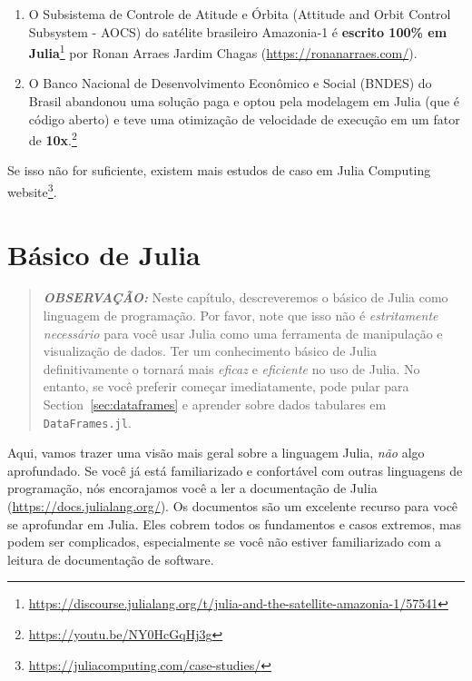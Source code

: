 \documentclass[
  notoc %
]{tufte-book}
\DeclareRobustCommand{\href}[2]{#2\footnote{\url{#1}}}
\newcommand{\passthrough}[1]{#1}
\begin{document}
\begin{enumerate}
{{  de 175x} para modelos de farmacologia da Pfizer usando GPUs em Julia}.
  Foi apresentado como um
  \href{https://chrisrackauckas.com/assets/Posters/ACoP11_Poster_Abstracts_2020.pdf}{poster}
  na 11ª American Conference of Pharmacometrics (ACoP11) e
  \href{https://web.archive.org/web/20210121164011/https://www.go-acop.org/abstract-awards}{ganhou
  um prêmio de qualidade}.
\item
  \href{https://discourse.julialang.org/t/julia-and-the-satellite-amazonia-1/57541}{O
  Subsistema de Controle de Atitude e Órbita (Attitude and Orbit Control
  Subsystem - AOCS) do satélite brasileiro Amazonia-1 é \textbf{escrito
  100\% em Julia}} por Ronan Arraes Jardim Chagas
  (\url{https://ronanarraes.com/}).
\item
  \href{https://youtu.be/NY0HcGqHj3g}{O Banco Nacional de
  Desenvolvimento Econômico e Social (BNDES) do Brasil abandonou uma
  solução paga e optou pela modelagem em Julia (que é código aberto) e
  teve uma otimização de velocidade de execução em um fator de
  \textbf{10x}.}
\end{enumerate}

Se isso não for suficiente, existem mais estudos de caso em
\href{https://juliacomputing.com/case-studies/}{Julia Computing
website}.

\hypertarget{sec:julia_basics}{%
\chapter{Básico de Julia}\label{sec:julia_basics}}

\begin{quote}
\textbf{\emph{OBSERVAÇÃO:}} Neste capítulo, descreveremos o básico de
Julia como linguagem de programação. Por favor, note que isso não é
\emph{estritamente necessário} para você usar Julia como uma ferramenta
de manipulação e visualização de dados. Ter um conhecimento básico de
Julia definitivamente o tornará mais \emph{eficaz} e \emph{eficiente} no
uso de Julia. No entanto, se você preferir começar imediatamente, pode
pular para Section~\ref{sec:dataframes} e aprender sobre dados tabulares
em \passthrough{\lstinline!DataFrames.jl!}.
\end{quote}

Aqui, vamos trazer uma visão mais geral sobre a linguagem Julia,
\emph{não} algo aprofundado. Se você já está familiarizado e confortável
com outras linguagens de programação, nós encorajamos você a ler a
documentação de Julia (\url{https://docs.julialang.org/}). Os documentos
são um excelente recurso para você se aprofundar em Julia. Eles cobrem
todos os fundamentos e casos extremos, mas podem ser complicados,
especialmente se você não estiver familiarizado com a leitura de
documentação de software.
\end{document}
